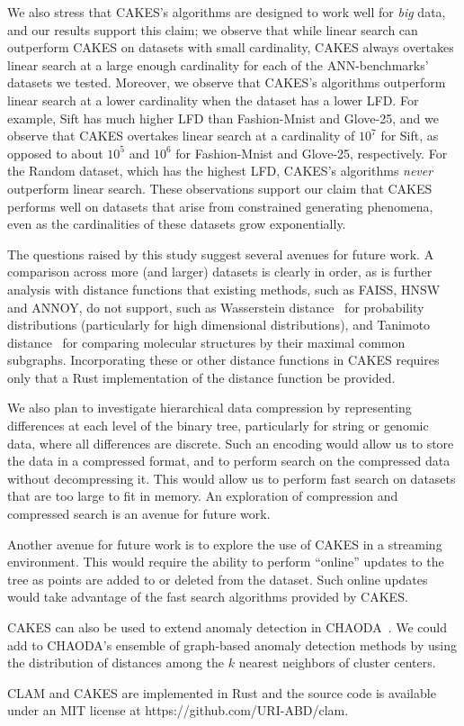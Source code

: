 We also stress that CAKES's algorithms are designed to work well for \textit{big} data, and our results support this claim;
we observe that while linear search can outperform CAKES on datasets with small cardinality, CAKES always overtakes linear search at a large enough cardinality for each of the ANN-benchmarks' datasets we tested.
Moreover, we observe that CAKES's algorithms outperform linear search at a lower cardinality when the dataset has a lower LFD.
For example, Sift has much higher LFD than Fashion-Mnist and Glove-25, and we observe that CAKES overtakes linear search at a cardinality of $10^7$ for Sift, as opposed to about $10^5$ and $10^6$ for Fashion-Mnist and Glove-25, respectively.
For the Random dataset, which has the highest LFD, CAKES's algorithms \textit{never} outperform linear search.
These observations support our claim that CAKES performs well on datasets that arise from constrained generating phenomena, even as the cardinalities of these datasets grow exponentially.

The questions raised by this study suggest several avenues for future work.
A comparison across more (and larger) datasets is clearly in order, as is further analysis with distance functions that existing methods, such as FAISS, HNSW and ANNOY, do not support, such as Wasserstein distance~\cite{vallender1974calculation} for probability distributions (particularly for high dimensional distributions), and Tanimoto distance~\cite{bajusz2015tanimoto} for comparing molecular structures by their maximal common subgraphs.
Incorporating these or other distance functions in CAKES requires only that a Rust implementation of the distance function be provided.

We also plan to investigate hierarchical data compression by representing differences at each level of the binary tree, particularly for string or genomic data, where all differences are discrete.
Such an encoding would allow us to store the data in a compressed format, and to perform search on the compressed data without decompressing it.
This would allow us to perform fast search on datasets that are too large to fit in memory.
An exploration of compression and compressed search is an avenue for future work.

Another avenue for future work is to explore the use of CAKES in a streaming environment.
This would require the ability to perform ``online'' updates to the tree as points are added to or deleted from the dataset.
Such online updates would take advantage of the fast search algorithms provided by CAKES.  %

CAKES can also be used to extend anomaly detection in CHAODA~\cite{ishaq2021clustered}.
We could add to CHAODA's ensemble of graph-based anomaly detection methods by using the distribution of distances among the $k$ nearest neighbors of cluster centers.

CLAM and CAKES are implemented in Rust and the source code is available under an MIT license at https://github.com/URI-ABD/clam.
